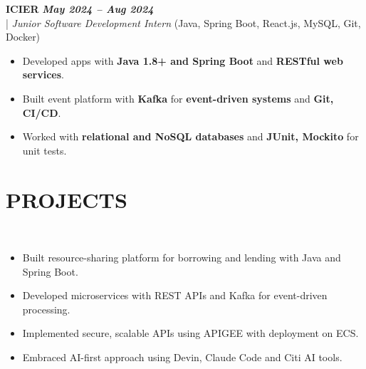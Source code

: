 \documentclass[10pt,a4paper]{article}
\begin{document}
\vspace{5pt}
\noindent
   \textbf{ICIER} \hfill \textit{\textbf{May 2024 -- Aug 2024}} \\
  \;|\;
  \textit{Junior Software Development Intern} (Java, Spring Boot, React.js, MySQL, Git, Docker)
  \hfill

\begin{itemize}



\item Developed apps with \textbf{Java 1.8+ and Spring Boot} and \textbf{RESTful web services}.



\item Built event platform with \textbf{Kafka} for \textbf{event-driven systems} and \textbf{Git, CI/CD}.



\item Worked with \textbf{relational and NoSQL databases} and \textbf{JUnit, Mockito} for unit tests.



\end{itemize}
\section*{PROJECTS}
\small

\noindent
{}\\[-12pt]
\begin{itemize}

\item Built resource-sharing platform for borrowing and lending with Java and Spring Boot.

\item Developed microservices with REST APIs and Kafka for event-driven processing.

\item Implemented secure, scalable APIs using APIGEE with deployment on ECS.

\item Embraced AI-first approach using Devin, Claude Code and Citi AI tools.

\end{itemize}
\end{document}
